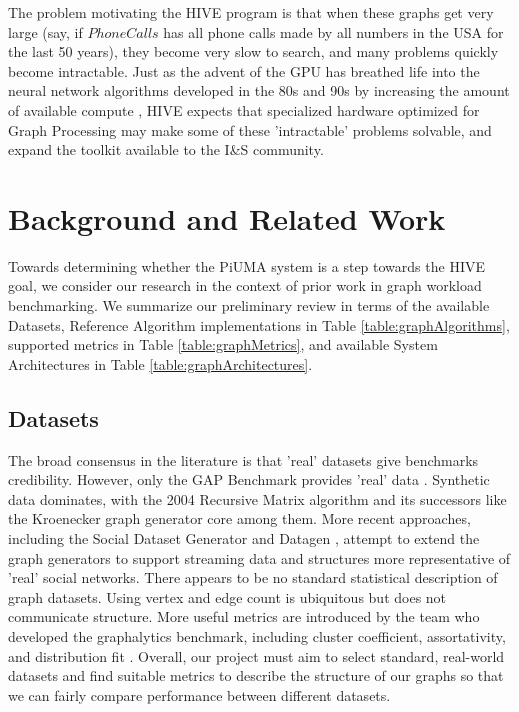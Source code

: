 \documentclass[letterpaper, 10pt]{article}
\begin{document}
\begin{multicols}{2}
        \par{The problem motivating the HIVE program is that when these graphs get very large (say, if $PhoneCalls$ has all phone calls made by all numbers in the USA for the last 50 years), they become very slow to search, and many problems quickly become intractable.
        Just as the advent of the GPU has breathed life into the neural network algorithms developed in the 80s and 90s by increasing the amount of available compute \cite{Dally2021}, HIVE expects that specialized hardware optimized for Graph Processing may make some of these 'intractable' problems solvable, and expand the toolkit available to the I\&S community.} 
        
    \section{Background and Related Work}\label{section:background}
        \par{Towards determining whether the PiUMA system is a step towards the HIVE goal, we consider our research in the context of prior work in graph workload benchmarking. 
        We summarize our preliminary review in terms of the available Datasets, Reference Algorithm implementations in Table \ref{table:graphAlgorithms}, supported metrics in Table \ref{table:graphMetrics}, and available System Architectures in Table \ref{table:graphArchitectures}.}

        \subsection{Datasets}\label{section:datasets}
        \par{The broad consensus in the literature is that 'real' datasets give benchmarks credibility. However, only the GAP Benchmark provides 'real' data \cite{Beamer2017}. 
        Synthetic data dominates, with the 2004 Recursive Matrix algorithm \cite{Chakrabarti2004} and its successors like the Kroenecker graph generator \cite{Leskovec2010} core among them. 
        More recent approaches, including the Social Dataset Generator \cite{Angles2013} and Datagen \cite{Capota2015}, attempt to extend the graph generators to support streaming data and structures more representative of 'real' social networks.
        There appears to be no standard statistical description of graph datasets. 
        Using vertex and edge count is ubiquitous but does not communicate structure. 
        More useful metrics are introduced by the team who developed the graphalytics benchmark, including cluster coefficient, assortativity, and distribution fit \cite{Capota2015}.
        Overall, our project must aim to select standard, real-world datasets and find suitable metrics to describe the structure of our graphs so that we can fairly compare performance between different datasets.
        

}
\end{multicols}
\end{document}
